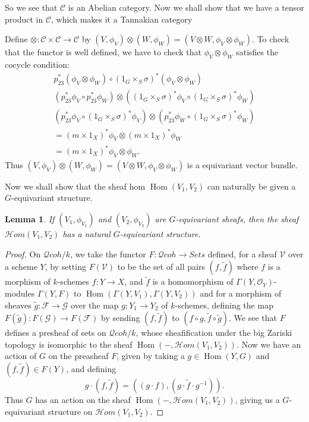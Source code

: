 \documentclass{article}
\newcommand{\Hom}{\operatorname{Hom}}
\newcommand{\sheafhom}{\mathcal{H}\mathit{om}}
\newcommand{\cat}{\mathcal C} %
\newtheorem{lemma}{Lemma}
\begin{document}
So we see that $\cat$ is an Abelian category. Now we shall show that we have a tensor product in $\cat$, which makes
it a Tannakian category

Define $\otimes: \cat \times \cat \rightarrow \cat$ by 
$(V,\phi_V) \otimes (W,\phi_W) = (V\otimes W,\phi_V \otimes \phi_W)$. To check that the functor is well defined,
we have to check that $\phi_V \otimes \phi_W$ satisfies the cocycle condition:
\begin{align*}
  p_{23}^* (\phi_V \otimes \phi_W) \circ (1_G \times_S \sigma) ^* (\phi_V \otimes \phi_W) \\
  (p_{23}^* \phi_V \circ p_{23}^* \phi_W) \otimes ((1_G \times_S \sigma) ^* \phi_V \circ (1_G \times_S \sigma) ^* \phi_W) \\
  (p_{23}^* \phi_V \circ (1_G \times_S \sigma) ^* \phi_V) \otimes (p_{23}^* \phi_W \circ (1_G \times_S \sigma) ^* \phi_W) \\
  = (m \times 1_X)^* \phi_V \otimes (m \times 1_X)^* \phi_W\\
  = (m \times 1_X)^* \phi_V \otimes \phi_W.
\end{align*}
Thus $(V,\phi_V) \otimes (W,\phi_W) = (V\otimes W,\phi_V \otimes \phi_W)$ is a equivariant vector bundle.

Now we shall show that the sheaf hom $\Hom(V_1,V_2)$ can naturally be given a $G$-equivariant structure.

\begin{lemma}
  If $(V_1,\phi_{V_1})$ and $(V_2,\phi_{V_2})$ are $G$-equivariant sheafs, then the sheaf $\sheafhom (V_1,V_2)$ has a 
  natural $G$-equivariant structure.
\end{lemma}

\begin{proof}
  On $\mathcal Qcoh/k$, we take the functor $F:\mathcal Qcoh \rightarrow Sets$ defined, for a sheaf
  $\mathcal V$ over a scheme $Y$, by setting $F(\mathcal V)$ to be the set of all pairs $(f,\tilde f)$ where $f$ 
  is a morphism of $k$-schemes $f:Y\rightarrow X$, and $\tilde f$ is a homomorphism of $\Gamma(Y,\mathcal O_Y)$-modules
  $\Gamma(Y,F)$ to $\Hom(\Gamma(Y,V_1),\Gamma(Y,V_2))$ and for a morphism of sheaves 
  $\tilde g:\mathcal F \rightarrow \mathcal G$ over the map $g:Y_1 \rightarrow Y_2$ of $k$-schemes, defining the map
  $F(\tilde g):F(\mathcal G) \rightarrow F(\mathcal F)$ by sending $(f,\tilde f)$ to 
  $(f\circ g,\tilde f \circ \tilde g)$. We see that $F$ defines a presheaf of sets on 
  $\mathcal Qcoh/k$, whose sheafification under the big Zariski topology is isomorphic to the sheaf
  $\Hom(-,\sheafhom (V_1,V_2))$. Now we have an action of $G$ on the preasheaf $F$, given by taking a 
  $g\in \Hom(Y,G)$ and $(f,\tilde f) \in F(Y)$, and defining 
  $$g\cdot (f,\tilde f) = ((g\cdot f), (g\cdot \tilde f\cdot g^{-1})).$$
  Thus $G$ has an action on the sheaf $\Hom(-,\sheafhom(V_1,V_2))$, giving us a $G$-equivariant structure on 
  $\sheafhom(V_1,V_2)$.
\end{proof}
\end{document}
